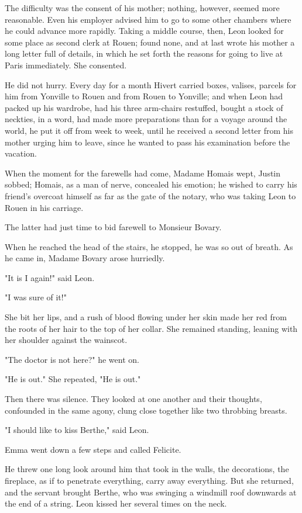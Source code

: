 \documentclass{tufte-book}
\begin{document}
The difficulty was the consent of his mother; nothing, however, seemed
more reasonable. Even his employer advised him to go to some other
chambers where he could advance more rapidly. Taking a middle course,
then, Leon looked for some place as second clerk at Rouen; found none,
and at last wrote his mother a long letter full of details, in which
he set forth the reasons for going to live at Paris immediately. She
consented.

He did not hurry. Every day for a month Hivert carried boxes, valises,
parcels for him from Yonville to Rouen and from Rouen to Yonville;
and when Leon had packed up his wardrobe, had his three arm-chairs
restuffed, bought a stock of neckties, in a word, had made more
preparations than for a voyage around the world, he put it off from week
to week, until he received a second letter from his mother urging him to
leave, since he wanted to pass his examination before the vacation.

When the moment for the farewells had come, Madame Homais wept, Justin
sobbed; Homais, as a man of nerve, concealed his emotion; he wished to
carry his friend's overcoat himself as far as the gate of the notary,
who was taking Leon to Rouen in his carriage.

The latter had just time to bid farewell to Monsieur Bovary.

When he reached the head of the stairs, he stopped, he was so out of
breath. As he came in, Madame Bovary arose hurriedly.

"It is I again!" said Leon.

"I was sure of it!"

She bit her lips, and a rush of blood flowing under her skin made her
red from the roots of her hair to the top of her collar. She remained
standing, leaning with her shoulder against the wainscot.

"The doctor is not here?" he went on.

"He is out." She repeated, "He is out."

Then there was silence. They looked at one another and their thoughts,
confounded in the same agony, clung close together like two throbbing
breasts.

"I should like to kiss Berthe," said Leon.

Emma went down a few steps and called Felicite.

He threw one long look around him that took in the walls, the
decorations, the fireplace, as if to penetrate everything, carry away
everything. But she returned, and the servant brought Berthe, who was
swinging a windmill roof downwards at the end of a string. Leon kissed
her several times on the neck.
\end{document}
